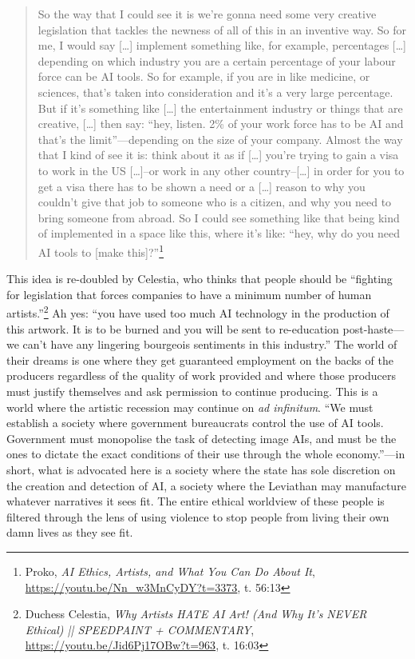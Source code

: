 \documentclass[11pt]{article}
\begin{document}
\begin{quote}
So the way that I could see it is we're gonna need some very creative legislation that tackles the newness of all of this in an inventive way. So for me, I would say [\ldots{}] implement something like, for example, percentages [\ldots{}] depending on which industry you are a certain percentage of your labour force can be AI tools. So for example, if you are in like medicine, or sciences, that's taken into consideration and it's a very large percentage. But if it's something like [\ldots{}] the entertainment industry or things that are creative, [\ldots{}] then say: ``hey, listen. 2\% of your work force has to be AI and that's the limit''---depending on the size of your company. Almost the way that I kind of see it is: think about it as if [\ldots{}] you're trying to gain a visa to work in the US [\ldots{}]--or work in any other country--[\ldots{}] in order for you to get a visa there has to be shown a need or a [\ldots{}] reason to why you couldn't give that job to someone who is a citizen, and why you need to bring someone from abroad. So I could see something like that being kind of implemented in a space like this, where it's like: ``hey, why do you need AI tools to [make this]?''\footnote{Proko, \emph{AI Ethics, Artists, and What You Can Do About It}, \url{https://youtu.be/Nn\_w3MnCyDY?t=3373}, t. 56:13}
\end{quote}

This idea is re-doubled by Celestia, who thinks that people should be ``fighting for legislation that forces companies to have a minimum number of human artists.''\footnote{Duchess Celestia, \emph{Why Artists HATE AI Art! (And Why It’s NEVER Ethical) || SPEEDPAINT + COMMENTARY}, \url{https://youtu.be/Jid6Pj17OBw?t=963}, t. 16:03} Ah yes: ``you have used too much AI technology in the production of this artwork. It is to be burned and you will be sent to re-education post-haste---we can't have any lingering bourgeois sentiments in this industry.'' The world of their dreams is one where they get guaranteed employment on the backs of the producers regardless of the quality of work provided and where those producers must justify themselves and ask permission to continue producing. This is a world where the artistic recession may continue on \emph{ad infinitum}. ``We must establish a society where government bureaucrats control the use of AI tools. Government must monopolise the task of detecting image AIs, and must be the ones to dictate the exact conditions of their use through the whole economy.''---in short, what is advocated here is a society where the state has sole discretion on the creation and detection of AI, a society where the Leviathan may manufacture whatever narratives it sees fit. The entire ethical worldview of these people is filtered through the lens of using violence to stop people from living their own damn lives as they see fit.
\end{document}
